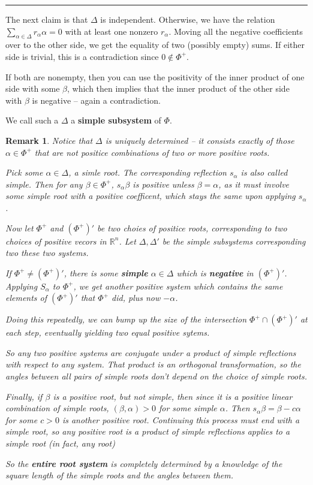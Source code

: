 \documentclass[12pt]{article}
\theoremstyle{nonumberbreak}
\theoremstyle{changebreak}
\theoremstyle{nonumberbreak}
\theoremstyle{change}
\newtheorem{rmk}[thm]{Remark}
\newcommand*{\R}{
\mathbb{R}
}
\newcommand*{\brk}{
\rule{2in}{.1pt}
}
\begin{document}
\brk

The next claim is that $\Delta$ is independent. Otherwise, we have the relation $\sum_{\alpha\in\Delta}r_\alpha \alpha=0$ with
at least one nonzero $r_\alpha$. Moving all the negative coefficients over to the other side, we get the equality of two
(possibly empty) sums. If either side is trivial, this is a contradiction since $0\notin\Phi^+$.

If both are nonempty, then you can use the positivity of the inner product of one side with some $\beta$,
which then implies that the inner product of the other side with $\beta$ is negative -- again a contradiction.

\begin{defn}
	We call such a $\Delta$ a \textbf{simple subsystem} of $\Phi$.
\end{defn}

\begin{rmk}
	Notice that $\Delta$ is uniquely determined -- it consists exactly of those $\alpha\in\Phi^+$ that are \textit{not} positice combinations of two or more positive roots.

	Pick some $\alpha\in\Delta$, a simle root. The corresponding reflection $s_\alpha$ is also called simple. Then for any $\beta\in\Phi^+$, 
	$s_\alpha\beta$ is positive unless $\beta=\alpha$, as it must involve some simple root with a positive coefficent, which stays the same upon applying $s_\alpha$.

	Now let $\Phi^+$ and $(\Phi^+)'$ be two choies of positice roots, corresponding to two choices of positive vecors in $\R^n$. Let $\Delta,\Delta'$ be the simple subsystems
	corresponding two these two systems.

	If $\Phi^+\ne(\Phi^+)'$, there is some \textbf{simple} $\alpha\in\Delta$ which is \textbf{negative} in $(\Phi^+)'$. Applying $S_\alpha$ to $\Phi^+$, we get another positive
	system which contains the same elements of $(\Phi^+)'$ that $\Phi^+$ did, plus now $-\alpha$.

	Doing this repeatedly, we can bump up the size of the intersection $\Phi^+\cap(\Phi^+)'$ at each step, eventually yielding
	two equal positive sytems.

	So any two positive systems are conjugate under a product of simple reflections with respect to any system. That product is 
	an orthogonal transformation, so the angles between all pairs of simple roots don't depend on the choice of simple roots.

	Finally, if $\beta$ is a positive root, but not simple, then since it is a positive linear combination of simple roots, 
	$(\beta,\alpha)>0$ for some simple $\alpha$. Then $s_\alpha\beta=\beta-c\alpha$ for some $c>0$ is another positive root.
	Continuing this process must end with a simple root, so any positive root is a product of simple reflections applies to a simple root (in fact, any root)

	So the \textbf{entire root system} is completely determined by a knowledge of the square length of the simple roots and the angles between them.
\end{rmk}
\end{document}
